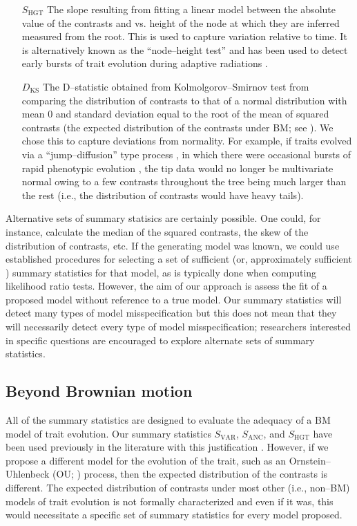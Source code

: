 \documentclass[a4paper,12pt]{article}
\begin{document}
\begin{enumerate}
\item[$S_{\text{HGT}}$] The slope resulting from fitting a linear model between the absolute value of the contrasts and vs. height of the node at which they are inferred measured from the root. This is used to capture variation relative to time. It is alternatively known as the ``node--height test'' and has been used to detect early bursts of trait evolution during adaptive radiations \citep{FreckletonHarvey2006, SlaterPennell}. 

\item[$D_{\text{KS}}$] The D--statistic obtained from Kolmolgorov--Smirnov test from comparing the distribution of contrasts to that of a normal distribution with mean $0$ and standard deviation equal to the root of the mean of squared contrasts (the expected distribution of the contrasts under BM; see \citep{Felsenstein1985, Rohlf2001}). We chose this to capture deviations from normality. For example, if traits evolved via a ``jump--diffusion'' type process \citep{Landis2012}, in which there were occasional bursts of rapid phenotypic evolution \citep{PennellPE}, the tip data would no longer be multivariate normal owing to a few contrasts throughout the tree being much larger than the rest (i.e., the distribution of contrasts would have heavy tails). 

\end{enumerate}

Alternative sets of summary statisics are certainly possible. One could, for instance, calculate the median of the squared contrasts, the skew of the distribution of contrasts, etc. If the generating model was known, we could use established procedures for selecting a set of sufficient (or, approximately sufficient \citep{MajoramJoyce}) summary statistics for that model, as is typically done when computing likelihood ratio tests. However, the aim of our approach is assess the fit of a proposed model without reference to a true model. Our summary statistics will detect many types of model misspecification but this does not mean that they will necessarily detect every type of model misspecification; researchers interested in specific questions are encouraged to explore alternate sets of summary statistics. 

\subsection*{Beyond Brownian motion}

All of the summary statistics are designed to evaluate the adequacy of a BM model of trait evolution. Our summary statistics $S_{\text{VAR}}$, $S_{\text{ANC}}$, and $S_{\text{HGT}}$ have been used previously in the literature with this justification \citep{Garland1992, Garland1993,  Diaz1996}. However, if we propose a different model for the evolution of the trait, such as an Ornstein--Uhlenbeck (OU; \citep{Hansen1997}) process, then the expected distribution of the contrasts is different. The expected distribution of contrasts under most other (i.e., non--BM) models of trait evolution is not formally characterized and even if it was, this would necessitate a specific set of summary statistics for every model proposed.
\end{document}
